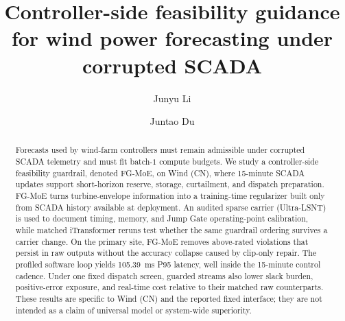 \documentclass[review,1p,times]{elsarticle}
\newif\ifincludefrontmatterextras
\newenvironment{highlights}{\par\noindent\textbf{Highlights}\par\begin{itemize}\itemsep0pt}{\end{itemize}\par}%
\begin{document}
\begin{frontmatter}

\title{Controller-side feasibility guidance for wind power forecasting under corrupted SCADA}

\author[1]{Junyu Li}

\author[1]{Juntao Du}



\ifincludefrontmatterextras
\begin{highlights}
\item FG-MoE improves controller-side admissibility for wind forecasting from corrupted SCADA streams.
\item Training-time feasibility guidance outperforms clip-only repair by removing above-rated violations without collapsing usable skill.
\item Matched iTransformer reruns preserve the same raw/clip-only/full-guardrail ordering on the main site.
\item An audited sparse carrier (Ultra-LSNT) is used for deployment profiling, and the profiled software loop remains well inside the 15-minute controller cadence (P95 105.39~ms).
\item Under one fixed operational interface on Wind (CN), guarded streams lower burden-type endpoints within matched forecast streams.
\end{highlights}
\fi

\begin{abstract}
Forecasts used by wind-farm controllers must remain admissible under corrupted SCADA telemetry and must fit batch-$1$ compute budgets. We study a controller-side feasibility guardrail, denoted FG-MoE, on Wind (CN), where 15-minute SCADA updates support short-horizon reserve, storage, curtailment, and dispatch preparation. FG-MoE turns turbine-envelope information into a training-time regularizer built only from SCADA history available at deployment. An audited sparse carrier (Ultra-LSNT) is used to document timing, memory, and Jump Gate operating-point calibration, while matched iTransformer reruns test whether the same guardrail ordering survives a carrier change. On the primary site, FG-MoE removes above-rated violations that persist in raw outputs without the accuracy collapse caused by clip-only repair. The profiled software loop yields 105.39~ms P95 latency, well inside the 15-minute control cadence. Under one fixed dispatch screen, guarded streams also lower slack burden, positive-error exposure, and real-time cost relative to their matched raw counterparts. These results are specific to Wind (CN) and the reported fixed interface; they are not intended as a claim of universal model or system-wide superiority.
\end{abstract}





\end{frontmatter}
\end{document}
